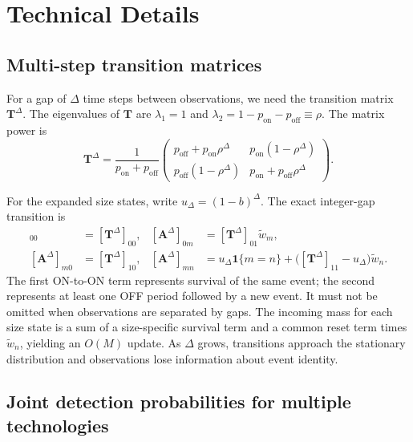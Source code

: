\documentclass[11pt]{article}
\newcommand{\ind}{\mathbf{1}}
\begin{document}
\section{Technical Details}
\label{sec:details}

\subsection{Multi-step transition matrices}
\label{sec:multistep}

For a gap of $\Delta$ time steps between observations, we need the transition matrix $\mathbf{T}^\Delta$. The eigenvalues of $\mathbf{T}$ are $\lambda_1 = 1$ and $\lambda_2 = 1 - p_{\text{on}} - p_{\text{off}} \equiv \rho$. The matrix power is
\begin{equation}
    \mathbf{T}^\Delta = \frac{1}{p_{\text{on}} + p_{\text{off}}}
    \begin{pmatrix}
        p_{\text{off}} + p_{\text{on}} \rho^\Delta & p_{\text{on}}(1 - \rho^\Delta) \\
        p_{\text{off}}(1 - \rho^\Delta) & p_{\text{on}} + p_{\text{off}} \rho^\Delta
    \end{pmatrix}.
\end{equation}

For the expanded size states, write $u_\Delta=(1-b)^\Delta$. The exact integer-gap transition is
\begin{align}
 [\mathbf A^\Delta]_{00}&=[\mathbf T^\Delta]_{00}, &
 [\mathbf A^\Delta]_{0m}&=[\mathbf T^\Delta]_{01}\tilde w_m,\\
 [\mathbf A^\Delta]_{m0}&=[\mathbf T^\Delta]_{10}, &
 [\mathbf A^\Delta]_{mn}&=u_\Delta\ind\{m=n\}
 +\bigl([\mathbf T^\Delta]_{11}-u_\Delta\bigr)\tilde w_n.
\end{align}
The first ON-to-ON term represents survival of the same event; the second represents at least one OFF period followed by a new event. It must not be omitted when observations are separated by gaps. The incoming mass for each size state is a sum of a size-specific survival term and a common reset term times $\tilde w_n$, yielding an $O(M)$ update. As $\Delta$ grows, transitions approach the stationary distribution and observations lose information about event identity.

\subsection{Joint detection probabilities for multiple technologies}
\label{sec:multitech}
\end{document}
